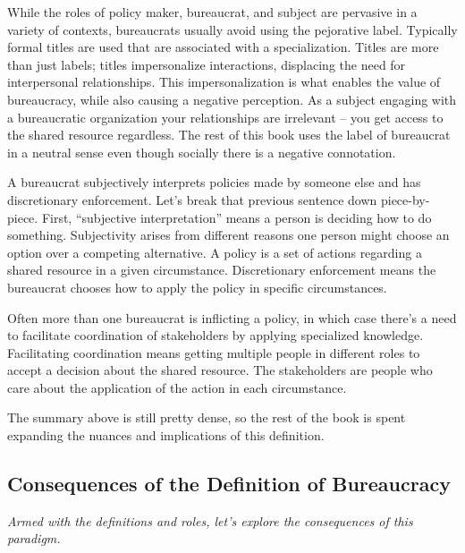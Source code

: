 While the roles of policy maker, bureaucrat, and subject are pervasive in a variety of contexts, bureaucrats usually avoid using the pejorative label. Typically formal titles are used that are associated with a specialization. Titles are more than just labels; titles impersonalize interactions, displacing the need for interpersonal relationships. This impersonalization is what enables the value of bureaucracy, while also causing a negative perception. As a subject engaging with a bureaucratic organization your relationships are irrelevant -- you get access to the shared resource regardless. The rest of this book uses the label of bureaucrat in a neutral sense even though socially there is a negative connotation.  

A \gls{bureaucrat} \iftoggle{glossaryinmargin}{\marginpar{[Glossary]}}{ }%
subjectively interprets policies made by someone else and has discretionary enforcement.  
Let's break that previous sentence down piece-by-piece. First, ``subjective interpretation'' means a person is deciding how to do something. Subjectivity arises from different reasons one person might choose an option over a competing alternative.  A \gls{policy} \iftoggle{glossaryinmargin}{\marginpar{[Glossary]}}{ }%
is a set of actions regarding a shared resource in a given circumstance. 
Discretionary enforcement means the bureaucrat chooses how to apply the policy in specific circumstances. 

Often more than one bureaucrat is inflicting a policy, in which case there's a need to facilitate coordination of stakeholders by applying specialized knowledge. 
Facilitating coordination means getting multiple people in different roles
to accept a decision about the shared resource. The stakeholders are people who care about the application of the action in each circumstance.  


The summary above is still pretty dense, so the rest of the book is spent expanding the nuances and implications of this definition.

\subsection*{Consequences of the Definition of Bureaucracy}

\textit{Armed with the definitions and roles, let's explore the consequences of this paradigm.}

